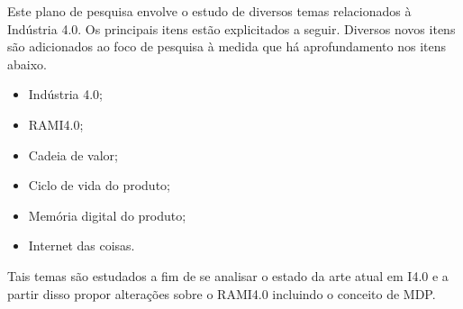 	Este plano de pesquisa envolve o estudo de diversos temas relacionados à Indústria 4.0. Os principais itens estão explicitados a seguir. Diversos novos itens são adicionados ao foco de pesquisa à medida que há aprofundamento nos itens abaixo.
	
	\begin{itemize}
		\item Indústria 4.0;
		\item RAMI4.0;
		\item Cadeia de valor;
		\item Ciclo de vida do produto;
		\item Memória digital do produto;
		\item Internet das coisas.
	\end{itemize}
	
	Tais temas são estudados a fim de se analisar o estado da arte atual em I4.0 e a partir disso propor alterações sobre o RAMI4.0 incluindo o conceito de MDP.
	